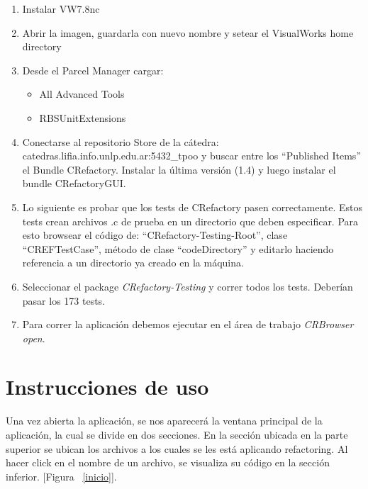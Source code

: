 \documentclass[a4paper,oneside,12pt]{article}
\begin{document}
\begin{enumerate}
\item Instalar VW7.8nc
\item Abrir la imagen, guardarla con nuevo nombre y setear el VisualWorks home directory

\item Desde el Parcel Manager cargar:
  \begin{itemize}
  \item All Advanced Tools
  \item RBSUnitExtensions
  \end{itemize}
  
\item Conectarse al repositorio Store de la c\'atedra: catedras.lifia.info.unlp.edu.ar:5432\_tpoo y buscar entre los “Published Items” el Bundle CRefactory. Instalar la \'ultima versi\'on (1.4) y luego instalar el bundle CRefactoryGUI.

\item Lo siguiente es probar que los tests de CRefactory pasen correctamente. Estos tests crean archivos .c de prueba en un directorio que deben especificar. Para esto browsear el c\'odigo de: “CRefactory-Testing-Root”, clase “CREFTestCase”, m\'etodo de clase “codeDirectory” y editarlo haciendo referencia a un directorio ya creado en la m\'aquina.
  
\item Seleccionar el package {\it CRefactory-Testing} y correr todos los tests. Deber\'ian pasar los 173 tests.

\item Para correr la aplicaci\'on debemos ejecutar en el \'area de trabajo  {\it CRBrowser open}. 
\end{enumerate}

\section{Instrucciones de uso}

Una vez abierta la aplicación, se nos aparecerá la ventana principal de la aplicación, la cual se divide en dos secciones. En la sección ubicada en la parte superior se ubican los archivos a los cuales se les está aplicando refactoring. Al hacer click en el nombre de un archivo, se visualiza su código en la sección inferior. [Figura ~\ref{inicio}].
\end{document}
